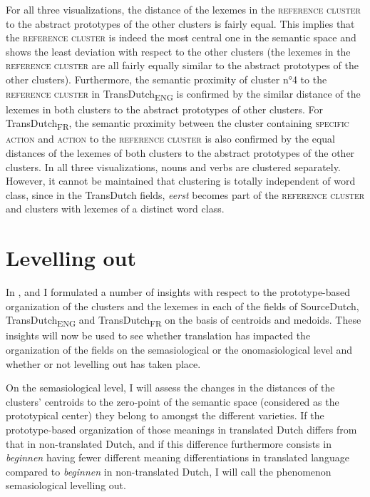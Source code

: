 For all three visualizations, the distance of the lexemes in the \textsc{reference cluster} to the abstract prototypes of the other clusters is fairly equal. This implies that the \textsc{reference cluster} is indeed the most central one in the semantic space and shows the least deviation with respect to the other clusters (the lexemes in the \textsc{reference cluster} are all fairly equally similar to the abstract prototypes of the other clusters). Furthermore, the semantic proximity of cluster n°4 to the \textsc{reference cluster} in TransDutch\textsubscript{ENG} is confirmed by the similar distance of the lexemes in both clusters to the abstract prototypes of other clusters. For TransDutch\textsubscript{FR}, the semantic proximity between the cluster containing {\textsc{specific}} \textsc{action} and \textsc{action} to the \textsc{reference cluster} is also confirmed by the equal distances of the lexemes of both clusters to the abstract prototypes of the other clusters. In all three visualizations, nouns and verbs are clustered separately. However, it cannot be maintained that clustering is totally independent of word class, since in the TransDutch fields, \textit{eerst} becomes part of the \textsc{reference cluster} and clusters with lexemes of a distinct word class.

\section{Levelling out}
\label{sec:4.5}  
In ,  and  I formulated a number of insights with respect to the prototype-based organization of the clusters and the lexemes in each of the fields of SourceDutch, TransDutch\textsubscript{ENG} and TransDutch\textsubscript{FR} on the basis of centroids and medoids. These insights will now be used to see whether translation has impacted the organization of the fields on the semasiological or the onomasiological level and whether or not levelling out has taken place.

On the semasiological level, I will assess the changes in the distances of the clusters’ centroids to the zero-point of the semantic space (considered as the prototypical center) they belong to amongst the different varieties. If the prototype-based organization of those meanings in translated Dutch differs from that in non-translated Dutch, and if this difference furthermore consists in \textit{beginnen} having fewer different meaning differentiations in translated language compared to \textit{beginnen} in non-translated Dutch, I will call the phenomenon semasiological levelling out.

